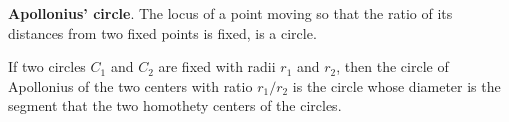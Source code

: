 \documentclass[12pt]{article}
\begin{document}
\textbf{Apollonius' circle}.
The locus of a point moving so that the ratio of its distances from two fixed points is fixed, is a circle.
\medskip


If two circles $C_1$ and $C_2$ are fixed with radii $r_1$ and $r_2$, then the circle of Apollonius of the two centers with ratio $r_1/r_2$ is the circle whose diameter is the segment that  the two homothety centers of the circles.
\end{document}
